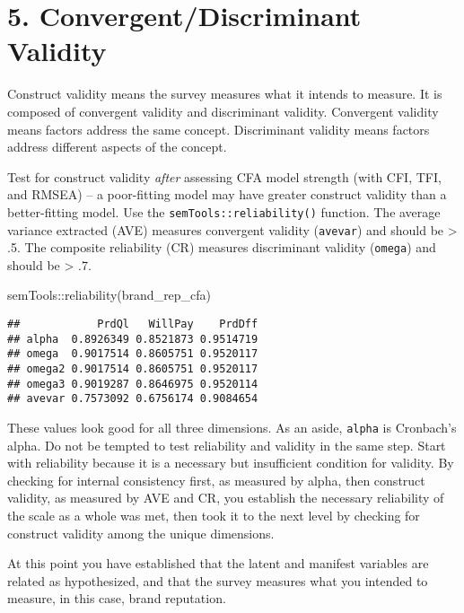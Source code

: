 \documentclass[
]{book}
\newenvironment{Shaded}{\begin{snugshade}}{\end{snugshade}}
\newcommand{\FunctionTok}[1]{\textcolor[rgb]{0.00,0.00,0.00}{#1}}
\newcommand{\NormalTok}[1]{#1}
\newcommand{\SpecialCharTok}[1]{\textcolor[rgb]{0.00,0.00,0.00}{#1}}
\theoremstyle{definition}
\theoremstyle{definition}
\theoremstyle{definition}
\theoremstyle{definition}
\theoremstyle{remark}
\begin{document}
\hypertarget{convergentdiscriminant-validity}{%
\section{5. Convergent/Discriminant Validity}\label{convergentdiscriminant-validity}}

Construct validity means the survey measures what it intends to measure. It is composed of convergent validity and discriminant validity. Convergent validity means factors address the same concept. Discriminant validity means factors address different aspects of the concept.

Test for construct validity \emph{after} assessing CFA model strength (with CFI, TFI, and RMSEA) -- a poor-fitting model may have greater construct validity than a better-fitting model. Use the \texttt{semTools::reliability()} function. The average variance extracted (AVE) measures convergent validity (\texttt{avevar}) and should be \textgreater{} .5. The composite reliability (CR) measures discriminant validity (\texttt{omega}) and should be \textgreater{} .7.

\begin{Shaded}
\begin{Highlighting}[]
\NormalTok{semTools}\SpecialCharTok{::}\FunctionTok{reliability}\NormalTok{(brand\_rep\_cfa)}
\end{Highlighting}
\end{Shaded}

\begin{verbatim}
##            PrdQl   WillPay    PrdDff
## alpha  0.8926349 0.8521873 0.9514719
## omega  0.9017514 0.8605751 0.9520117
## omega2 0.9017514 0.8605751 0.9520117
## omega3 0.9019287 0.8646975 0.9520114
## avevar 0.7573092 0.6756174 0.9084654
\end{verbatim}

These values look good for all three dimensions. As an aside, \texttt{alpha} is Cronbach's alpha. Do not be tempted to test reliability and validity in the same step. Start with reliability because it is a necessary but insufficient condition for validity. By checking for internal consistency first, as measured by alpha, then construct validity, as measured by AVE and CR, you establish the necessary reliability of the scale as a whole was met, then took it to the next level by checking for construct validity among the unique dimensions.

At this point you have established that the latent and manifest variables are related as hypothesized, and that the survey measures what you intended to measure, in this case, brand reputation.
\end{document}
